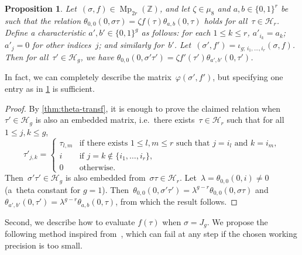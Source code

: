 \documentclass[12pt,oneside]{amsart}
\numberwithin{equation}{section}
\newtheorem{prop}[equation]{Proposition}
\theoremstyle{definition}
\newcommand{\Z}{\mathbb{Z}}
\newcommand{\Half}{\mathcal{H}}
\renewcommand{\phi}{\varphi}
\newcommand{\embedsp}[2]{\iota_{#1;\,#2}}
\DeclareMathOperator{\Mp}{Mp}
\begin{document}
\begin{prop}
  \label{prop:phi-embed}
  Let~$(\sigma,f)\in \Mp_{2r}(\Z)$, and let $\zeta\in \mu_8$ and
  $a,b\in\{0,1\}^r$ be such that the relation
  $\theta_{0,0}(0,\sigma\tau) = \zeta f(\tau) \theta_{a,b}(0,\tau)$ holds for
  all~$\tau\in \Half_r$. Define a characteristic $a',b'\in \{0,1\}^g$ as
  follows: for each $1\leq k\leq r$, $a'_{i_k} = a_k$; $a'_j = 0$ for other
  indices~$j$; and similarly
  for~$b'$. Let~$(\sigma',f')=\embedsp{g}{i_1,\ldots,i_r}(\sigma,f)$. Then for
  all~$\tau'\in \Half_g$, we have
  $\theta_{0,0}(0,\sigma'\tau') = \zeta f'(\tau') \theta_{a',b'}(0,\tau')$.
\end{prop}

In fact, we can completely describe the matrix~$\phi(\sigma',f')$, but
specifying one entry as in \cref{prop:phi-embed} is sufficient.

\begin{proof}
  By \cref{thm:theta-transf}, it is enough to prove the claimed relation
  when~$\tau'\in \Half_g$ is also an embedded matrix, i.e.~there
  exists~$\tau\in \Half_r$ such that for all $1\leq j,k\leq g$,
  \begin{displaymath}
    \tau'_{j,k} =
    \begin{cases}
      \tau_{l,m} &\text{if there exists $1\leq l,m\leq r$ such that $j = i_l$ and $k = i_m$},\\
      i &\text{if } j = k\notin\{i_1,\ldots,i_r\},\\
      0 &\text{otherwise}.
    \end{cases}
  \end{displaymath}
  Then~$\sigma'\tau'\in \Half_g$ is also embedded from~$\sigma\tau\in
  \Half_r$. Let~$\lambda = \theta_{0,0}(0,i)\neq 0$ (a~theta constant for
  $g=1$).
  Then~$\theta_{0,0}(0,\sigma'\tau') = \lambda^{g-r}\theta_{0,0}(0,\sigma\tau)$
  and $\theta_{a',b'}(0,\tau') = \lambda^{g-r}\theta_{a,b}(0,\tau)$, from which
  the result follows.
\end{proof}

Second, we describe how to evaluate $f(\tau)$ when $\sigma = J_g$. We propose
the following method inspired
from~\cite[§3.2.3]{molinComputingPeriodMatrices2019}, which can fail at any
step if the chosen working precision is too small.
\end{document}
